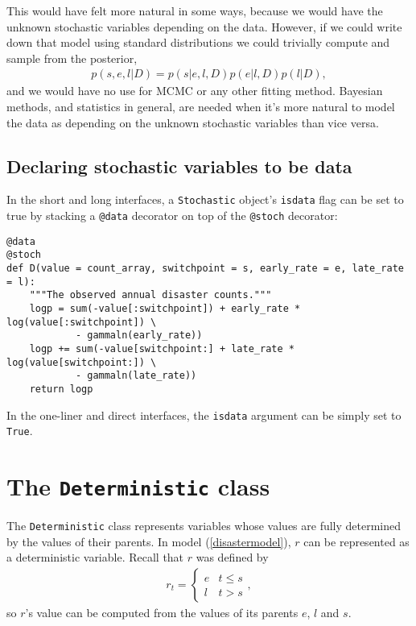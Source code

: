 This would have felt more natural in some ways, because we would have the unknown stochastic variables depending on the data. However, if we could write down that model using standard distributions we could trivially compute and sample from the posterior,
\begin{eqnarray*}
    p(s,e,l|D) = p(s|e, l, D) p(e|l, D) p(l|D),
\end{eqnarray*}
and we would have no use for MCMC or any other fitting method. Bayesian methods, and statistics in general, are needed when it's more natural to model the data as depending on the unknown stochastic variables than vice versa.

\subsection{Declaring stochastic variables to be data}

In the short and long interfaces, a \texttt{Stochastic} object's \texttt{isdata} flag can be set to true by stacking a \texttt{@data} decorator on top of the \texttt{@stoch} decorator:
\begin{verbatim}
@data
@stoch
def D(value = count_array, switchpoint = s, early_rate = e, late_rate = l):
    """The observed annual disaster counts."""
    logp = sum(-value[:switchpoint]) + early_rate * log(value[:switchpoint]) \
            - gammaln(early_rate))
    logp += sum(-value[switchpoint:] + late_rate * log(value[switchpoint:]) \
            - gammaln(late_rate))
    return logp
\end{verbatim}
In the one-liner and direct interfaces, the \texttt{isdata} argument can be simply set to \texttt{True}.


\section{The \texttt{Deterministic} class}\label{dtrm}

The \texttt{Deterministic} class represents variables whose values are fully determined by the values of their parents. In model (\ref{disastermodel}), $r$ can be represented as a deterministic variable. Recall that $r$ was defined by
\begin{eqnarray*}
    r_t=\left\{\begin{array}{ll}
        e & t\le s\\ l & t>s
        \end{array}\right.,
\end{eqnarray*}
so $r$'s value can be computed from the values of its parents $e$, $l$ and $s$.

